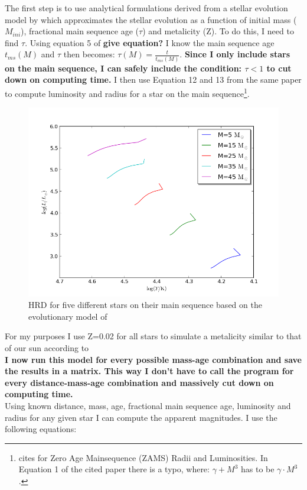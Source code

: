 \documentclass[a4paper,10pt]{article}
\begin{document}
 The first step is to use analytical formulations derived from a stellar evolution model by \citet*{2000MNRAS.315..543H} which approximates the
 stellar evolution as a function of initial mass ($M_{ini}$), fractional main sequence age ($\tau$) and metalicity (Z).
 To do this, I need to find $\tau$. Using equation 5 of \citep{2000MNRAS.315..543H} \textbf{give equation?} I know the main sequence age 
 $t_{ms}(M)$ and $\tau$ then becomes: $\tau(M)=\frac{t}{t_{ms}(M)}$. \textbf{Since I only include stars on the main sequence, I can safely include
 the condition: $\tau<1$ to cut down on computing time.}
 I then use Equation 12 and 13 from the same paper to compute luminosity and radius for a star on the main sequence\footnote{
 \citet{2000MNRAS.315..543H} cites \citet*{1996MNRAS.281..257T} for Zero Age Mainsequence (ZAMS) Radii and Luminosities. 
 In Equation 1 of the cited paper there is a typo, where: $\gamma + M^3$ has to be $\gamma \cdot M^3$.}.\\
 
  \begin{figure}[h!]
  \includegraphics[width=\textwidth]{lumiradius}
  \caption{HRD for five different stars on their main sequence based on the evolutionary model of \citet{2000MNRAS.315..543H} \label{lumiradius}}
 \end{figure}
 
 For my purposes I use Z=0.02 for all stars to simulate a metalicity similar to that of our sun according to \citet*{1998SSRv...85..161G}\\
 \textbf{I now run this model for every possible mass-age combination and save the results in a matrix. This way I don't have to call the program for
 every distance-mass-age combination and massively cut down on computing time.}\\
 Using known distance, mass, age, fractional main sequence age, luminosity and radius for any given star I can  
 compute the apparent magnitudes. I use the following equations:
 
\end{document}
